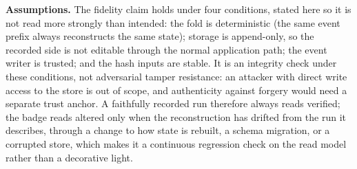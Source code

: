 \textbf{Assumptions.} The fidelity claim holds under four conditions, stated
here so it is not read more strongly than intended: the fold is deterministic
(the same event prefix always reconstructs the same state); storage is
append-only, so the recorded side is not editable through the normal application
path; the event writer is trusted; and the hash inputs are stable. It is an
integrity check under these conditions, not adversarial tamper resistance: an
attacker with direct write access to the store is out of scope, and authenticity
against forgery would need a separate trust anchor. A faithfully recorded run
therefore always reads verified; the badge reads altered only when the
reconstruction has drifted from the run it describes, through a change to how
state is rebuilt, a schema migration, or a corrupted store, which makes it a
continuous regression check on the read model rather than a decorative light.
